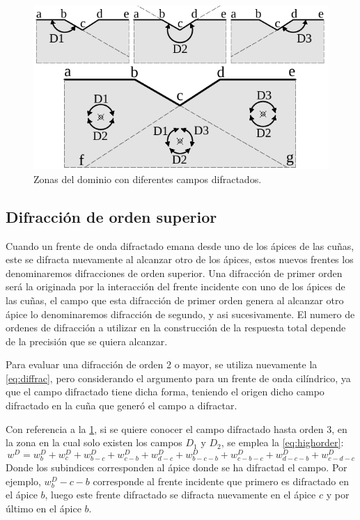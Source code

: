 \documentclass[spanish,letterpaper,12pt,twoside,openany]{article}
\begin{document}
%
\begin{figure}[H]
    \centering
    \includegraphics[width=10 cm]{img/dominiodif.pdf}
    \caption{Zonas del dominio con diferentes campos difractados.}
    \label{fig:domdif}
\end{figure}
%
%
%
%
%
\subsection{Difracción de orden superior}
%
Cuando un frente de onda difractado emana desde uno de los ápices de las cuñas, este se difracta nuevamente al alcanzar otro de los ápices, estos nuevos frentes los denominaremos difracciones de orden superior. Una difracción de primer orden será la originada por la interacción del frente incidente con uno de los ápices de las cuñas, el campo que esta difracción de primer orden genera al alcanzar otro ápice lo denominaremos difracción de segundo, y asi sucesivamente. El numero de ordenes de difracción a utilizar en la construcción de la respuesta total depende de la precisión que se quiera alcanzar.

Para evaluar una difracción de orden 2 o mayor, se utiliza nuevamente la \cref{eq:diffrac}, pero considerando el argumento para un frente de onda cilíndrico, ya que el campo difractado tiene dicha forma, teniendo el origen dicho campo difractado en la cuña que generó el campo a difractar.

Con referencia a la \cref{fig:domdif}, si se quiere conocer el campo difractado hasta orden 3, en la zona en la cual solo existen los campos $D_1$ y $D_2$, se emplea la \cref{eq:highorder}:
%
\begin{equation}
w^D=w^D_b+w^D_c+w^D_{b-c}+w^D_{c-b}+w^D_{d-c}+w^D_{b-c-b}+w^D_{c-b-c}+w^D_{d-c-b}+w^D_{c-d-c} 
\label{eq:highorder}
\end{equation}
%
Donde los subindices corresponden al ápice donde se ha difractad el campo. Por ejemplo, $w^D_b-c-b$ corresponde al frente incidente que primero es difractado en el ápice $b$, luego este frente difractado se difracta nuevamente en el ápice $c$ y por último en el ápice $b$.
%
%
%
%
%
\end{document}
